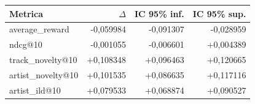 \begin{tabular}{lrrr}
\toprule
Metrica & $\Delta$ & IC 95\% inf. & IC 95\% sup. \\
\midrule
average\_reward & -0,059984 & -0,091307 & -0,028959 \\
ndcg@10 & -0,001055 & -0,006601 & +0,004389 \\
track\_novelty@10 & +0,108348 & +0,096463 & +0,120665 \\
artist\_novelty@10 & +0,101535 & +0,086635 & +0,117116 \\
artist\_ild@10 & +0,079533 & +0,068874 & +0,090527 \\
\bottomrule
\end{tabular}
